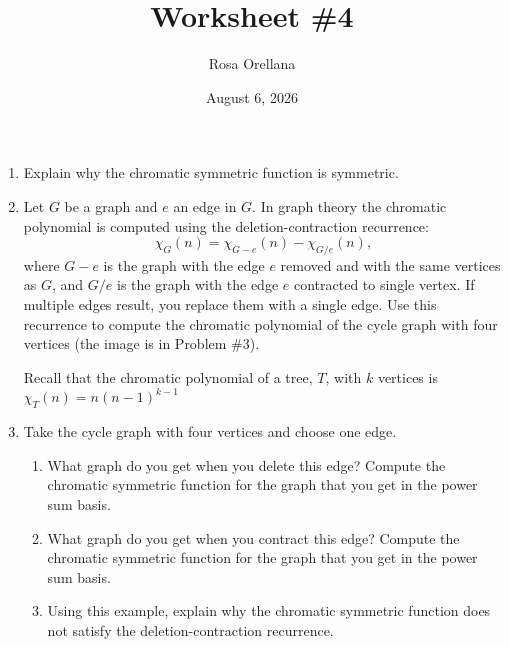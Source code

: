 \documentclass{article}
\title{Worksheet \#4}
\author{Rosa Orellana}
\date{August 6, 2026}
\begin{document}
\maketitle
\begin{enumerate}
\item Explain why the chromatic symmetric function is symmetric. 
\item Let $G$ be a graph and $e$ an edge in $G$. In graph theory the chromatic polynomial is computed using the deletion-contraction recurrence: 
\[\chi_G(n) = \chi_{G-e}(n) -\chi_{G/e}(n), \] where $G-e$ is the graph with the edge $e$ removed and with the same vertices as $G$, and $G/e$ is the graph with the edge $e$ contracted to single vertex. If multiple edges result, you replace them with a single edge. 
Use this recurrence to compute the chromatic polynomial of the cycle graph with four vertices (the image is in Problem \#3).

Recall that the chromatic polynomial of a tree, $T$,  with $k$ vertices is $\chi_T(n) = n(n-1)^{k-1}$

\item Take the cycle graph with four vertices and choose one edge. 
\begin{center}
\end{center}
\begin{enumerate}
    \item What graph do you get when you delete this edge? Compute the chromatic symmetric function for the graph that you get in the power sum basis. 
    \item What graph do you get when you contract this edge? Compute the chromatic symmetric function for the graph that you get in the power sum basis. 
    \item Using this example, explain why the chromatic symmetric function does not satisfy the deletion-contraction recurrence. 
\end{enumerate}


\end{enumerate}
\end{document}

